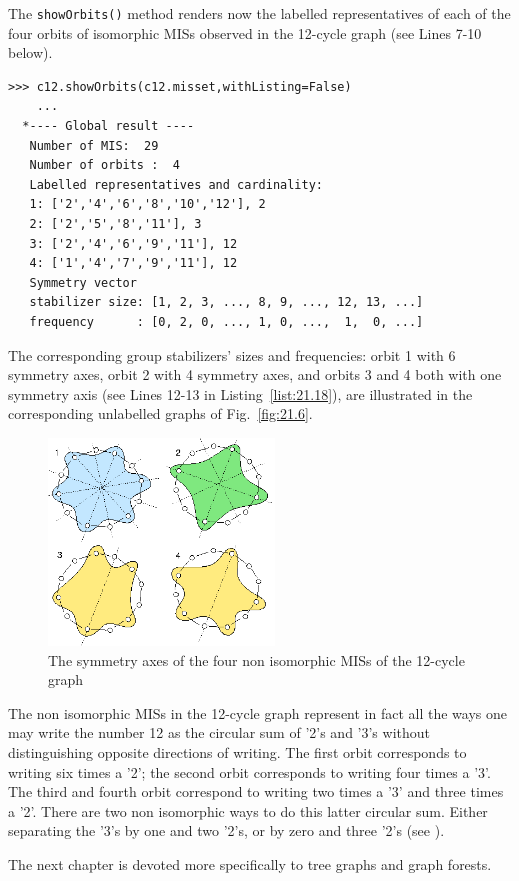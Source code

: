 The \texttt{showOrbits()} method renders now the labelled representatives of each of the four orbits of isomorphic MISs observed in the 12-cycle graph (see Lines 7-10 below).
\begin{lstlisting}[caption={Computing the MISs orbits of the 12-cycle graph},label=list:21.18]
>>> c12.showOrbits(c12.misset,withListing=False)
    ...
  *---- Global result ----
   Number of MIS:  29
   Number of orbits :  4
   Labelled representatives and cardinality:
   1: ['2','4','6','8','10','12'], 2
   2: ['2','5','8','11'], 3
   3: ['2','4','6','9','11'], 12
   4: ['1','4','7','9','11'], 12
   Symmetry vector
   stabilizer size: [1, 2, 3, ..., 8, 9, ..., 12, 13, ...]
   frequency      : [0, 2, 0, ..., 1, 0, ...,  1,  0, ...]
\end{lstlisting}
The corresponding group stabilizers' sizes and frequencies: orbit 1 with 6 symmetry axes, orbit 2 with 4 symmetry axes, and orbits 3 and 4 both with one symmetry axis (see Lines 12-13 in Listing~\vref{list:21.18}), are illustrated in the corresponding unlabelled graphs of Fig.~\vref{fig:21.6}.
\begin{figure}[h]
\sidecaption[t]
\includegraphics[width=6cm]{Figures/21-5-c12.png}
\caption{The symmetry axes of the four non isomorphic MISs of the 12-cycle graph} 
\label{fig:21.6}       %
\end{figure}

The non isomorphic MISs in the 12-cycle graph represent in fact all the ways one may write the number 12 as the circular sum of '2's and '3's without distinguishing opposite directions of writing. The first orbit corresponds to writing six times a '2'; the second orbit corresponds to writing four times a '3'. The third and fourth orbit correspond to writing two times a '3' and three times a '2'. There are two non isomorphic ways to do this latter circular sum. Either separating the '3's by one and two '2's, or by zero and three '2's (see \citep{ISOMIS-08}).

\vspace{1cm}

\noindent The next chapter is devoted more specifically to tree graphs and graph forests.

\clearpage

\typeout{}

%